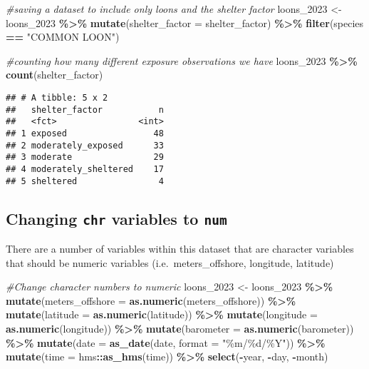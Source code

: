 \documentclass[
]{article}
\newenvironment{Shaded}{\begin{snugshade}}{\end{snugshade}}
\newcommand{\AttributeTok}[1]{\textcolor[rgb]{0.13,0.29,0.53}{#1}}
\newcommand{\CommentTok}[1]{\textcolor[rgb]{0.56,0.35,0.01}{\textit{#1}}}
\newcommand{\FunctionTok}[1]{\textcolor[rgb]{0.13,0.29,0.53}{\textbf{#1}}}
\newcommand{\NormalTok}[1]{#1}
\newcommand{\OtherTok}[1]{\textcolor[rgb]{0.56,0.35,0.01}{#1}}
\newcommand{\SpecialCharTok}[1]{\textcolor[rgb]{0.81,0.36,0.00}{\textbf{#1}}}
\newcommand{\StringTok}[1]{\textcolor[rgb]{0.31,0.60,0.02}{#1}}
\begin{document}
\begin{Shaded}
\begin{Highlighting}[]
\CommentTok{\#saving a dataset to include only loons and the shelter factor}
\NormalTok{loons\_2023 }\OtherTok{\textless{}{-}}\NormalTok{ loons\_2023 }\SpecialCharTok{\%\textgreater{}\%} 
  \FunctionTok{mutate}\NormalTok{(}\AttributeTok{shelter\_factor =}\NormalTok{ shelter\_factor) }\SpecialCharTok{\%\textgreater{}\%} 
  \FunctionTok{filter}\NormalTok{(species }\SpecialCharTok{==} \StringTok{"COMMON LOON"}\NormalTok{)}

\CommentTok{\#counting how many different exposure observations we have}
\NormalTok{loons\_2023 }\SpecialCharTok{\%\textgreater{}\%} 
  \FunctionTok{count}\NormalTok{(shelter\_factor)}
\end{Highlighting}
\end{Shaded}

\begin{verbatim}
## # A tibble: 5 x 2
##   shelter_factor           n
##   <fct>                <int>
## 1 exposed                 48
## 2 moderately_exposed      33
## 3 moderate                29
## 4 moderately_sheltered    17
## 5 sheltered                4
\end{verbatim}

\hypertarget{changing-chr-variables-to-num}{%
\subsection{\texorpdfstring{Changing \texttt{chr} variables to
\texttt{num}}{Changing chr variables to num}}\label{changing-chr-variables-to-num}}

There are a number of variables within this dataset that are character
variables that should be numeric variables (i.e.~meters\_offshore,
longitude, latitude)

\begin{Shaded}
\begin{Highlighting}[]
\CommentTok{\#Change character numbers to numeric}
\NormalTok{loons\_2023 }\OtherTok{\textless{}{-}}\NormalTok{ loons\_2023 }\SpecialCharTok{\%\textgreater{}\%} 
  \FunctionTok{mutate}\NormalTok{(}\AttributeTok{meters\_offshore =} \FunctionTok{as.numeric}\NormalTok{(meters\_offshore)) }\SpecialCharTok{\%\textgreater{}\%} 
  \FunctionTok{mutate}\NormalTok{(}\AttributeTok{latitude =} \FunctionTok{as.numeric}\NormalTok{(latitude)) }\SpecialCharTok{\%\textgreater{}\%} 
  \FunctionTok{mutate}\NormalTok{(}\AttributeTok{longitude =} \FunctionTok{as.numeric}\NormalTok{(longitude)) }\SpecialCharTok{\%\textgreater{}\%} 
  \FunctionTok{mutate}\NormalTok{(}\AttributeTok{barometer =} \FunctionTok{as.numeric}\NormalTok{(barometer)) }\SpecialCharTok{\%\textgreater{}\%} 
  \FunctionTok{mutate}\NormalTok{(}\AttributeTok{date =} \FunctionTok{as\_date}\NormalTok{(date, }\AttributeTok{format =} \StringTok{"\%m/\%d/\%Y"}\NormalTok{)) }\SpecialCharTok{\%\textgreater{}\%} 
  \FunctionTok{mutate}\NormalTok{(}\AttributeTok{time =}\NormalTok{ hms}\SpecialCharTok{::}\FunctionTok{as\_hms}\NormalTok{(time)) }\SpecialCharTok{\%\textgreater{}\%} 
  \FunctionTok{select}\NormalTok{(}\SpecialCharTok{{-}}\NormalTok{year, }\SpecialCharTok{{-}}\NormalTok{day, }\SpecialCharTok{{-}}\NormalTok{month)}
\end{Highlighting}
\end{Shaded}
\end{document}

